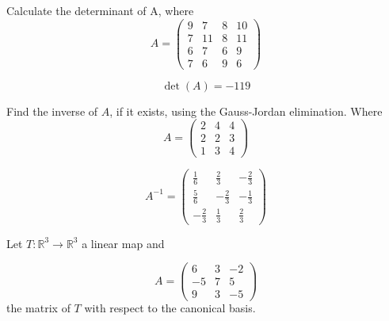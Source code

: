 \begin{questions}

\question Calculate the determinant of A, where
$$
A=\left(\begin{array}{rrrr}
9 & 7 & 8 & 10 \\
7 & 11 & 8 & 11 \\
6 & 7 & 6 & 9 \\
7 & 6 & 9 & 6
\end{array}\right)
$$

\begin{solution}
$$\det(A)=-119$$
\end{solution}

\question Find the inverse of $A$, if it exists, using the Gauss-Jordan elimination. Where
$$
A=\left(\begin{array}{rrr}
2 & 4 & 4 \\
2 & 2 & 3 \\
1 & 3 & 4
\end{array}\right)
$$

\begin{solution}
$$A^{-1}=\left(\begin{array}{rrr}
\frac{1}{6} & \frac{2}{3} & -\frac{2}{3} \\
\frac{5}{6} & -\frac{2}{3} & -\frac{1}{3} \\
-\frac{2}{3} & \frac{1}{3} & \frac{2}{3}
\end{array}\right)$$
\end{solution}

\question Let $T:\mathbb{R}^3\rightarrow\mathbb{R}^3$  a linear map and
 
$$
A=\left(\begin{array}{rrr}
6 & 3 & -2 \\
-5 & 7 & 5 \\
9 & 3 & -5
\end{array}\right)
$$
the matrix of $T$ with respect to the canonical basis.
\end{questions}
